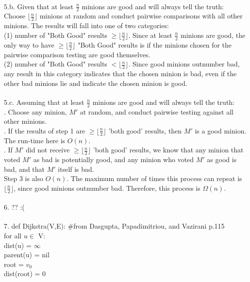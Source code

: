 \documentclass[11pt, oneside]{article}   	%
\begin{document}
\\
5.b.  Given that at least $\frac{n}{2}$ minions are good and will always tell the truth:\\
\indent Choose $\lfloor \frac{n}{2} \rfloor$ minions at random and conduct pairwise comparisons with all other minions.  The results will fall into one of two categories:\\
\indent\indent (1) number of "Both Good" results $ \geq \lfloor \frac{n}{2} \rfloor$. Since at least $\frac{n}{2}$ minions are good, the only way to have $ \geq \lfloor \frac{n}{2} \rfloor$ "Both Good" results is if the minions chosen for the pairwise comparison testing are good themselves.\\
\indent\indent (2)  number of "Both Good" results $ < \lfloor \frac{n}{2} \rfloor$.  Since good minions outnumber bad, any result in this category indicates that the chosen minion is bad, even if the other bad minions lie and indicate the chosen minion is good.\\
\\
5.c.  Assuming that at least $\frac{n}{2}$ minions are good and will always tell the truth:\\
.  Choose any minion, $M'$ at random, and conduct pairwise testing against all other minions.\\
.  If the results of step 1 are $ \geq \lfloor \frac{n}{2} \rfloor$ 'both good' results, then $M'$ is a good minion.  The run-time here is $O(n).$  \\
.  If $ M' $ did not receive $ \geq \lfloor \frac{n}{2} \rfloor$ 'both good' results, we know that any minion that voted $M'$ as bad is potentially good, and any minion who voted $M'$ as good is bad, and that $M'$ itself is bad.  \\
\indent  Step 3 is also $O(n)$.  The maximum number of times this process can repeat is $\lfloor \frac{n}{2} \rfloor$, since good minions outnumber bad.  Therefore, this process is $\Omega (n)$.\\
\\
6. ?? :(\\
\\
7.  def Dijkstra(V,E): \#from Dasgupta, Papadimitriou, and Vazirani p.115\\
\indent for all $u \in$ V:\\
\indent dist(u) = $\infty$  \\
\indent parent(u) = nil\\
\indent root = $v_0$\\
\indent dist(root) = 0\\
\end{document}
